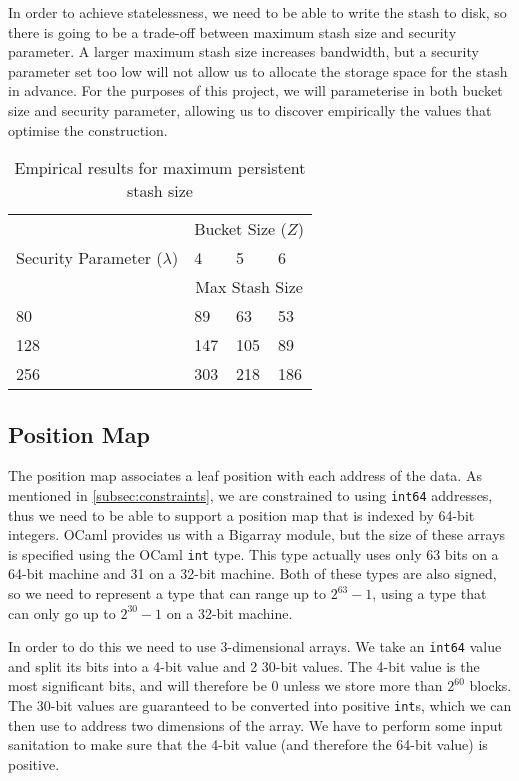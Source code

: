\documentclass[12pt,a4paper,twoside,openright]{report}
\begin{document}
In order to achieve statelessness, we need to be able to write the stash to disk, so there is going to be a trade-off between maximum stash size and security parameter. A larger maximum stash size increases bandwidth, but a security parameter set too low will not allow us to allocate the storage space for the stash in advance. For the purposes of this project, we will parameterise in both bucket size and security parameter, allowing us to discover empirically the values that optimise the construction.

\begin{table}
\centering
\begin{tabular}{|l|l|l|l|}
	\hline
	& \multicolumn{3}{c|}{Bucket Size ($Z$)} \\
	\cline{2-4}
	Security Parameter ($\lambda$) & 4 & 5 & 6 \\
	\cline{2-4}
	& \multicolumn{3}{c|}{Max Stash Size} \\
	\hline
	80 & 89 & 63 & 53 \\
	\hline
	128 & 147 & 105 & 89 \\
	\hline
	256 & 303 & 218 & 186 \\
	\hline
\end{tabular}
\caption{Empirical results for maximum persistent stash size}
\label{tab:stashsizes}
\end{table}

\subsection{Position Map}

The position map associates a leaf position with each address of the data. As mentioned in \cref{subsec:constraints}, we are constrained to using \texttt{int64} addresses, thus we need to be able to support a position map that is indexed by 64-bit integers. OCaml provides us with a Bigarray module, but the size of these arrays is specified using the OCaml \texttt{int} type. This type actually uses only 63 bits on a 64-bit machine and 31 on a 32-bit machine. Both of these types are also signed, so we need to represent a type that can range up to $2^{63} - 1$, using a type that can only go up to $2^{30} - 1$ on a 32-bit machine.

In order to do this we need to use 3-dimensional arrays. We take an \texttt{int64} value and split its bits into a 4-bit value and 2 30-bit values. The 4-bit value is the most significant bits, and will therefore be 0 unless we store more than $2^{60}$ blocks. The 30-bit values are guaranteed to be converted into positive \texttt{int}s, which we can then use to address two dimensions of the array. We have to perform some input sanitation to make sure that the 4-bit value (and therefore the 64-bit value) is positive.
\end{document}
